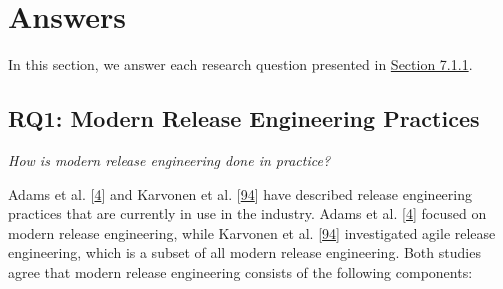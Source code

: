 \documentclass[]{book}
\begin{document}
\section{Answers}\label{answers-3}

In this section, we answer each research question presented in
\protect\hyperlink{research-questions-1}{Section 7.1.1}.

\subsection{RQ1: Modern Release Engineering
Practices}\label{rq1-modern-release-engineering-practices}

\emph{How is modern release engineering done in practice?}

Adams et al. {[}\protect\hyperlink{ref-adams2016a}{4}{]} and Karvonen et
al. {[}\protect\hyperlink{ref-karvonen2017a}{94}{]} have described
release engineering practices that are currently in use in the industry.
Adams et al. {[}\protect\hyperlink{ref-adams2016a}{4}{]} focused on
modern release engineering, while Karvonen et al.
{[}\protect\hyperlink{ref-karvonen2017a}{94}{]} investigated agile
release engineering, which is a subset of all modern release
engineering. Both studies agree that modern release engineering consists
of the following components:
\end{document}
